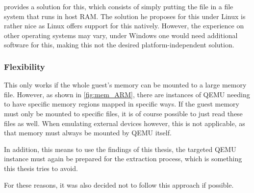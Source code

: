  provides a solution for this,
which consists of simply putting the file in a file system that runs in host RAM.
The solution he proposes for this under Linux is rather nice as Linux offers support for this natively.
However, the experience on other operating systems may vary, under Windows one would need additional software for this,
making this not the desired platform-independent solution.

\subsubsection{Flexibility}
This only works if the whole guest's memory can be mounted to a large memory file.
However, as shown in \autoref{fig:mem_ARM},
there are instances of QEMU needing to have specific memory regions mapped in specific ways.
If the guest memory must only be mounted to specific files,
it is of course possible to just read these files as well.
When emulating external devices however,
this is not applicable, as that memory must always be mounted by QEMU itself.

In addition, this means to use the findings of this thesis,
the targeted QEMU instance must again be prepared for the extraction process,
which is something this thesis tries to avoid.

For these reasons, it was also decided not to follow this approach if possible.